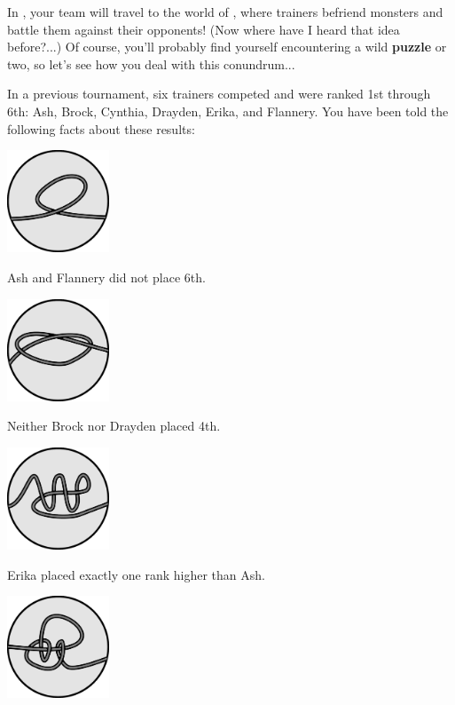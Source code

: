 

In \phEventName{}, your team will travel to the world of
\textbf{\mappMobimon{}}, where trainers befriend monsters and battle them
against their opponents!
(Now where have I heard that idea before?...) Of course, you'll probably
find yourself encountering a wild \textbf{puzzle} or two, so let's see how
you deal with this conundrum...

In a previous \mappMobimon{} tournament, six trainers competed and were
ranked 1st through 6th: Ash, Brock, Cynthia, Drayden, Erika, and Flannery.
You have been told the following facts about these results:

\begin{multicols}{3}\footnotesize
  \begin{center}
    \includegraphics[width=1.2in]{assets/unknot1.pdf}

    Ash and Flannery did not place 6th.


    \includegraphics[width=1.2in]{assets/knot1.pdf}

    Neither Brock nor Drayden placed 4th.


    \includegraphics[width=1.2in]{assets/unknot2.pdf}

    Erika placed exactly one rank higher than Ash.


    \includegraphics[width=1.2in]{assets/knot2.pdf}


\end{center}
\end{multicols}
